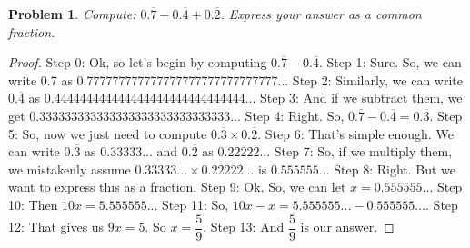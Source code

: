 \documentclass{article}
\newtheorem{theorem}{Problem}
\begin{document}
\begin{theorem}
Compute: $0.\overline{7}-0.\overline{4}+0.\overline{2}$. Express your answer as a common fraction.
\end{theorem}

\begin{proof}
Step 0: Ok, so let's begin by computing $0.\overline{7}-0.\overline{4}$.
Step 1: Sure. So, we can write $0.\overline{7}$ as $0.777777777777777777777777777777...$
Step 2: Similarly, we can write $0.\overline{4}$ as $0.444444444444444444444444444444...$
Step 3: And if we subtract them, we get $0.333333333333333333333333333333...$
Step 4: Right. So, $0.\overline{7}-0.\overline{4} = 0.\overline{3}$.
Step 5: So, now we just need to compute $0.\overline{3} \times 0.\overline{2}$.
Step 6: That's simple enough. We can write $0.\overline{3}$ as $0.33333...$ and $0.\overline{2}$ as $0.22222...$
Step 7: So, if we multiply them, we mistakenly assume $0.33333... \times 0.22222...$ is $0.555555...$
Step 8: Right. But we want to express this as a fraction.
Step 9: Ok. So, we can let $x = 0.555555...$
Step 10: Then $10x = 5.555555...$
Step 11: So, $10x - x = 5.555555... - 0.555555...$.
Step 12: That gives us $9x = 5$. So $x = \dfrac{5}{9}$.
Step 13: And $\dfrac{5}{9}$ is our answer.
\end{proof}
\end{document}

